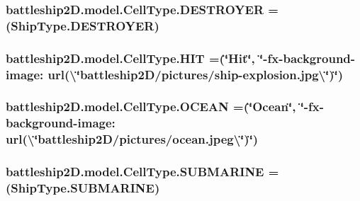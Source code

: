 \hypertarget{enumbattleship2D_1_1model_1_1CellType_a89b7d59bf01fbd390393926de5b840b6}{
\subsubsection[{D\-E\-S\-T\-R\-O\-Y\-E\-R}]{\setlength{\rightskip}{0pt plus 5cm}battleship2\-D.\-model.\-Cell\-Type.\-D\-E\-S\-T\-R\-O\-Y\-E\-R =(Ship\-Type.\-D\-E\-S\-T\-R\-O\-Y\-E\-R)}}\label{enumbattleship2D_1_1model_1_1CellType_a89b7d59bf01fbd390393926de5b840b6}
\hypertarget{enumbattleship2D_1_1model_1_1CellType_aedac6244a22b1b1a7a7dc2887ea3827a}{
\subsubsection[{H\-I\-T}]{\setlength{\rightskip}{0pt plus 5cm}battleship2\-D.\-model.\-Cell\-Type.\-H\-I\-T =(\char`\"{}Hit\char`\"{}, \char`\"{}-\/fx-\/background-\/image\-: url(\textbackslash{}\char`\"{}battleship2\-D/pictures/ship-\/explosion.\-jpg\textbackslash{}\char`\"{})\char`\"{})}}\label{enumbattleship2D_1_1model_1_1CellType_aedac6244a22b1b1a7a7dc2887ea3827a}
\hypertarget{enumbattleship2D_1_1model_1_1CellType_af010e793915bcca6ccc54b59d6687b0f}{
\subsubsection[{O\-C\-E\-A\-N}]{\setlength{\rightskip}{0pt plus 5cm}battleship2\-D.\-model.\-Cell\-Type.\-O\-C\-E\-A\-N =(\char`\"{}Ocean\char`\"{}, \char`\"{}-\/fx-\/background-\/image\-: url(\textbackslash{}\char`\"{}battleship2\-D/pictures/ocean.\-jpeg\textbackslash{}\char`\"{})\char`\"{})}}\label{enumbattleship2D_1_1model_1_1CellType_af010e793915bcca6ccc54b59d6687b0f}
\hypertarget{enumbattleship2D_1_1model_1_1CellType_af0cd87a32526f247a9347043d4c57a6e}{
\subsubsection[{S\-U\-B\-M\-A\-R\-I\-N\-E}]{\setlength{\rightskip}{0pt plus 5cm}battleship2\-D.\-model.\-Cell\-Type.\-S\-U\-B\-M\-A\-R\-I\-N\-E =(Ship\-Type.\-S\-U\-B\-M\-A\-R\-I\-N\-E)}}\label{enumbattleship2D_1_1model_1_1CellType_af0cd87a32526f247a9347043d4c57a6e}
